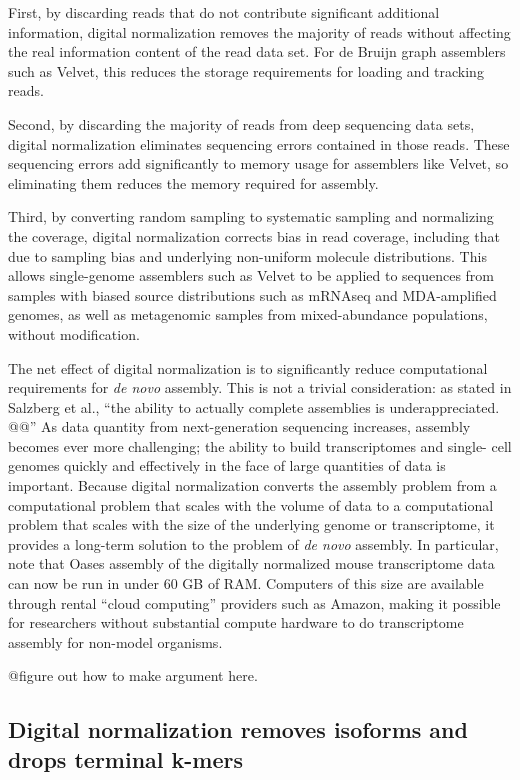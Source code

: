 \documentclass[10pt]{article}
\begin{document}
First, by discarding reads that do not contribute significant
additional information, digital normalization removes the majority of
reads without affecting the real information content of the read data
set.  For de Bruijn graph assemblers such as Velvet, this reduces the
storage requirements for loading and tracking reads.

Second, by discarding the majority of reads from deep sequencing data sets, digital normalization eliminates
sequencing errors contained in those reads.  These sequencing errors add
significantly to memory usage for assemblers like Velvet, so
eliminating them reduces the memory required for assembly.

Third, by converting random sampling to systematic sampling and
normalizing the coverage, digital normalization corrects bias in read
coverage, including that due to sampling bias and underlying
non-uniform molecule distributions.  This allows single-genome
assemblers such as Velvet to be applied to sequences from samples with
biased source distributions such as mRNAseq and MDA-amplified genomes,
as well as metagenomic samples from mixed-abundance populations,
without modification.

The net effect of digital normalization is to significantly reduce
computational requirements for {\em de novo} assembly.  This is not a
trivial consideration: as stated in Salzberg et al., ``the ability to
actually complete assemblies is underappreciated. @@'' As data
quantity from next-generation sequencing increases, assembly becomes
ever more challenging; the ability to build transcriptomes and single-
cell genomes quickly and effectively in the face of large quantities
of data is important.  Because digital normalization converts the
assembly problem from a computational problem that scales with the
volume of data to a computational problem that scales with the size of
the underlying genome or transcriptome, it provides a long-term
solution to the problem of {\em de novo} assembly.  In particular,
note that Oases assembly of the digitally normalized mouse
transcriptome data can now be run in under 60 GB of RAM.  Computers
of this size are available through rental ``cloud computing'' providers
such as Amazon, making it possible for researchers without substantial
compute hardware to do transcriptome assembly for non-model organisms.

@figure out how to make argument here.

\subsection*{Digital normalization removes isoforms and drops terminal k-mers}
\end{document}
